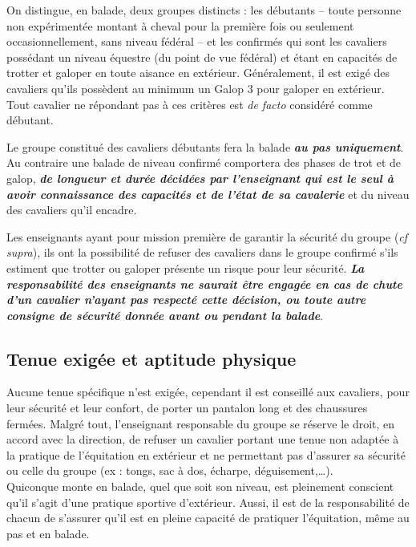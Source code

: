 \documentclass[11pt,a4paper]{article}
\renewcommand{\emph}[1]{\textit{\textbf{#1}}}
\begin{document}
      On distingue, en balade, deux groupes distincts : les \og débutants \fg{} -- toute personne non expérimentée montant à cheval pour la première fois ou seulement occasionnellement, sans niveau fédéral -- et les \og confirmés \fg{} qui sont les cavaliers possédant un niveau équestre (du point de vue fédéral) et étant en capacités de trotter et galoper en toute aisance en extérieur.
      Généralement, il est exigé des cavaliers qu'ils possèdent au minimum un Galop 3 pour galoper en extérieur.
      Tout cavalier ne répondant pas à ces critères est \textit{de facto} considéré comme débutant.

      Le groupe constitué des cavaliers débutants fera la balade \emph{au pas uniquement}.
      Au contraire une balade de niveau confirmé comportera des phases de trot et de galop, \emph{de longueur et durée décidées par l'enseignant qui est le seul à avoir connaissance des capacités et de l'état de sa cavalerie} et du niveau des cavaliers qu'il encadre.

      Les enseignants ayant pour mission première de garantir la sécurité du groupe (\textit{cf supra}), ils ont la possibilité de refuser des cavaliers dans le groupe confirmé s'ils estiment que trotter ou galoper présente un risque pour leur sécurité. \emph{La responsabilité des enseignants ne saurait être engagée en cas de chute d'un cavalier n'ayant pas respecté cette décision, ou toute autre consigne de sécurité donnée avant ou pendant la balade}.

   \subsection*{Tenue exigée et aptitude physique}
      Aucune tenue spécifique n'est exigée, cependant il est conseillé aux cavaliers, pour leur sécurité et leur confort, de porter un pantalon long et des chaussures fermées.
      Malgré tout, l'enseignant responsable du groupe se réserve le droit, en accord avec la direction, de refuser un cavalier portant une tenue non adaptée à la pratique de l'équitation en extérieur et ne permettant pas d'assurer sa sécurité ou celle du groupe (ex : tongs, sac à dos, écharpe, déguisement,\dots).\\

      Quiconque monte en balade, quel que soit son niveau, est pleinement conscient qu'il s'agit d'une pratique sportive d'extérieur.
      Aussi, il est de la responsabilité de chacun de s'assurer qu'il est en pleine capacité de pratiquer l'équitation, même au pas et en balade.
\end{document}
